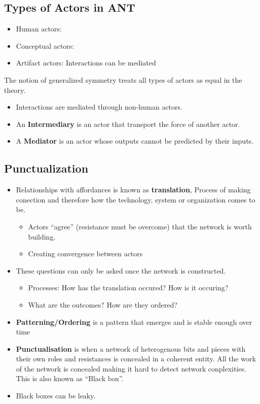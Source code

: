 \documentclass[a4paper]{article}
\numberwithin{equation}{section}
\begin{document}
\subsection{Types of Actors in ANT}
\begin{itemize}
    \item Human actors:
    \item Conceptual actors:
    \item Artifact actors: Interactions can be mediated
\end{itemize}
The notion of generalized symmetry treats all types of actors as equal in the theory.
\begin{itemize}
    \item Interactions are mediated through non-human actors.
    \item An \textbf{Intermediary} is an actor that transport the force of another actor.
    \item A \textbf{Mediator} is an actor whose outputs cannot be predicted by their inputs.
\end{itemize}
\subsection{Punctualization}
\begin{itemize}
    \item Relationships with affordances is known as \textbf{translation}, Process of making conection and therefore how the technology, system or organization comes to be.
    \begin{itemize}
        \item Actors ``agree'' (resistance must be overcome) that the network is worth building.
        \item Creating convergence between actors
    \end{itemize} 
    \item These questions can only be asked once the network is constructed.
    \begin{itemize}
        \item Processes: How has the translation occured? How is it occuring?
        \item What are the outcomes? How are they ordered?
    \end{itemize}
    \item \textbf{Patterning/Ordering} is a pattern that emerges and is stable enough over time
    \item \textbf{Punctualisation} is when a network of heterogenous bits and pieces with their own roles and resistances is concealed in a coherent entity. All the work of the network is concealed making it hard to detect network conplexities. This is also known as ``Black box''.
    \item Black boxes can be leaky.
\end{itemize}
\end{document}
